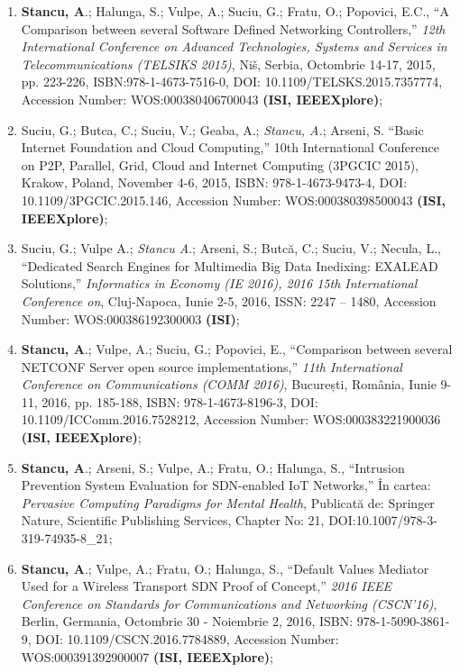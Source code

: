 \begin{enumerate}
	\item \textbf{Stancu, A}.; Halunga, S.; Vulpe, A.; Suciu, G.; Fratu, O.; Popovici, E.C., ``A Comparison between several Software Defined Networking Controllers,'' \textit{12th International Conference on Advanced Technologies, Systems and Services in Telecommunications (TELSIKS 2015)}, Niš, Serbia, Octombrie 14-17, 2015, pp. 223-226, ISBN:978-1-4673-7516-0, DOI: 10.1109/TELSKS.2015.7357774, Accession Number: WOS:000380406700043 \textbf{(ISI, IEEEXplore)}\label{item:comparison_sdn};
	
	\item Suciu, G.; Butca, C.; Suciu, V.; Geaba, A.; \textit{Stancu, A.}; Arseni, S. ``Basic Internet Foundation and Cloud Computing,'' 10th International Conference on P2P, Parallel, Grid, Cloud and Internet Computing (3PGCIC 2015), Krakow, Poland, November 4-6, 2015, ISBN: 978-1-4673-9473-4, DOI: 10.1109/3PGCIC.2015.146, Accession Number: WOS:000380398500043 \textbf{(ISI, IEEEXplore)};
	
	\item Suciu, G.; Vulpe A.; \textit{Stancu A}.; Arseni, S.; Butcă, C.; Suciu, V.; Necula, L., ``Dedicated Search Engines for Multimedia Big Data Inedixing: EXALEAD Solutions,'' \textit{Informatics in Economy (IE 2016), 2016 15th International Conference on}, Cluj-Napoca, Iunie 2-5, 2016, ISSN: 2247 – 1480,  Accession Number: WOS:000386192300003 \textbf{(ISI)};
	
	\item \textbf{Stancu, A}.; Vulpe, A.; Suciu, G.; Popovici, E., ``Comparison between several NETCONF Server open source implementations,'' \textit{11th International Conference on Communications (COMM 2016)}, București, România, Iunie 9-11, 2016, pp. 185-188, ISBN: 978-1-4673-8196-3, DOI: 10.1109/ICComm.2016.7528212, Accession Number: WOS:000383221900036 \textbf{(ISI, IEEEXplore)}\label{item:comparison_netconf};
	
	\item \textbf{Stancu, A}.; Arseni, S.; Vulpe, A.; Fratu, O.; Halunga, S., ``Intrusion Prevention System Evaluation for SDN-enabled IoT Networks,'' În cartea: \textit{Pervasive Computing Paradigms for Mental Health}, Publicată de: Springer Nature, Scientific Publishing Services, Chapter No: 21, DOI:10.1007/978-3-319-74935-8\_21\label{item:ips_iot};
	
	\item \textbf{Stancu, A}.; Vulpe, A.; Fratu, O.; Halunga, S., ``Default Values Mediator Used for a Wireless Transport SDN Proof of Concept,'' \textit{2016 IEEE Conference on Standards for Communications and Networking (CSCN'16)}, Berlin, Germania, Octombrie 30 - Noiembrie 2, 2016, ISBN: 978-1-5090-3861-9, DOI: 10.1109/CSCN.2016.7784889, Accession Number: WOS:000391392900007 \textbf{(ISI, IEEEXplore)}\label{item:dvm_v01};
	

\end{enumerate}
